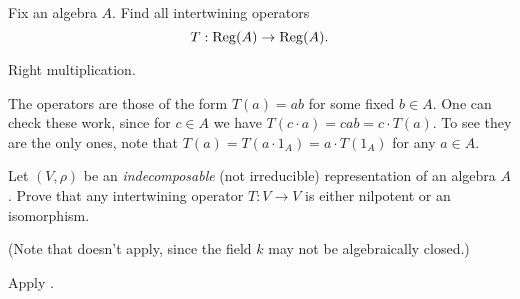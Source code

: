 \begin{sproblem}
	\label{prob:regA_intertwine}
	Fix an algebra $A$.
	Find all intertwining operators 
	\[ T : \operatorname{Reg}(A) \to \operatorname{Reg}(A). \]
	\begin{hint}
		Right multiplication.
	\end{hint}
	\begin{sol}
		The operators are those of the form $T(a) = ab$
		for some fixed $b \in A$.
		One can check these work, since for $c \in A$
		we have $T(c \cdot a) = cab = c \cdot T(a)$.
		To see they are the only ones, note that
		$T(a) = T(a \cdot 1_A) = a \cdot T(1_A)$ for any $a \in A$.
	\end{sol}
\end{sproblem}

\begin{problem}
	\gim
	Let $(V, \rho)$ be an \emph{indecomposable}
	(not irreducible) representation of an algebra $A$.
	Prove that any intertwining operator $T : V \to V$
	is either nilpotent or an isomorphism.

	(Note that  doesn't apply,
	since the field $k$ may not be algebraically closed.)
	\begin{hint}
		Apply .
	\end{hint}
\end{problem}
